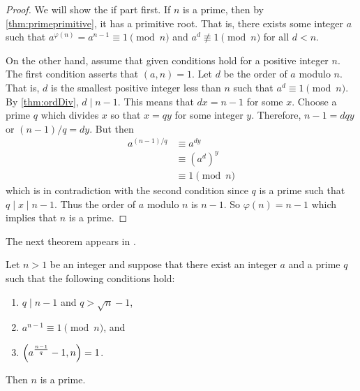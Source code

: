 	\begin{proof}
		We will show the if part first. If $n$ is a prime, then by \autoref{thm:primeprimitive}, it has a primitive root. That is, there exists some integer $a$ such that $a^{\varphi(n)} = a^{n-1} \equiv 1 \pmod n$ and $a^d \not \equiv 1 \pmod n$ for all $d<n$.

		On the other hand, assume that given conditions hold for a positive integer $n$. The first condition asserts that $(a,n)=1$. Let $d$ be the order of $a$ modulo $n$. That is, $d$ is the smallest positive integer less than $n$ such that $a^d \equiv 1 \pmod n$. By \autoref{thm:ordDiv}, $d\mid n-1$. This means that $dx = n-1$ for some $x$. Choose a prime $q$ which divides $x$ so that $x=qy$ for some integer $y$. Therefore, $n-1=dqy$ or $(n-1)/q=dy$. But then
			\begin{align*}
				a^{(n-1)/q}
					& \equiv a^{dy}\\
					& \equiv \left(a^d\right)^y\\
					& \equiv 1 \pmod n
			\end{align*}
		which is in contradiction with the second condition since $q$ is a prime such that $q\mid x\mid n-1$. Thus the order of $a$ modulo $n$ is $n-1$. So $\varphi(n)=n-1$ which implies that $n$ is a prime.
	\end{proof}
The next theorem appears in \textcite[Chapter $\S$VI, section $6.3$, proposition $6.3.1$, Page $187$]{koblitz_2012}.
	\begin{theorem}
		Let $n>1$ be an integer and suppose that there exist an integer $a$ and a prime $q$ such that the following conditions hold:
			\begin{enumerate}
				\item $q\mid n-1$ and $q > \sqrt n -1$,
				\item $a^{n-1} \equiv1\pmod n$, and
				\item $\left(a^{\frac{n-1}{q}}-1,n\right) = 1$.
			\end{enumerate}
		Then $n$ is a prime.
	\end{theorem}

